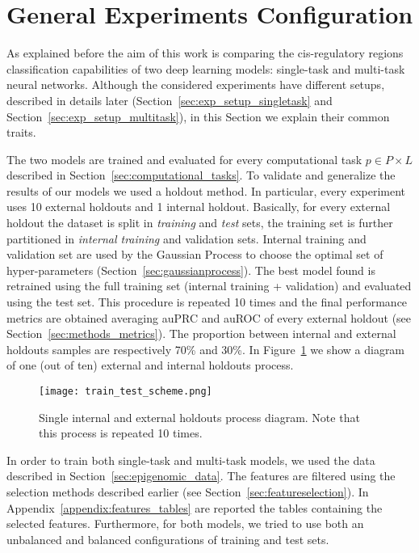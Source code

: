\section{General Experiments Configuration}
\label{sec:exp_setup_general}
As explained before the aim of this work is comparing the  cis-regulatory regions classification capabilities of two deep learning models: single-task and multi-task neural networks. Although the considered experiments have different setups, described in details later (Section~\ref{sec:exp_setup_singletask} and Section~\ref{sec:exp_setup_multitask}), in this Section we explain their common traits. 

The two models are trained and evaluated for every computational task $p \in P \times L$ described in Section~\ref{sec:computational_tasks}. 
To validate and generalize the results of our
models we used a holdout method. In particular, every experiment uses 10 external holdouts and 1 internal
holdout. Basically, for every external
holdout the dataset is split in \emph{training} and \emph{test} sets, the
training set is further partitioned in \emph{internal training} and validation
sets. Internal training and validation set are used by the Gaussian Process to
choose the optimal set of hyper-parameters (Section~\ref{sec:gaussianprocess}).
The best model found is retrained using the full training set (internal training + validation) and evaluated using the test set. This procedure is
repeated 10 times and the final performance metrics are obtained averaging auPRC
and auROC of every external holdout (see Section~\ref{sec:methods_metrics}). The proportion between internal and external holdouts samples are respectively 70\% and 30\%. In Figure~\ref{fig:train_test_diagram} we show a diagram of one (out of ten) external and internal holdouts process. 
\begin{figure}[ht]
\centering
\texttt{[image: train\_test\_scheme.png]}
\caption{Single internal and external holdouts process diagram. Note that this
process is repeated 10 times.} 
\label{fig:train_test_diagram}
\end{figure}
In order to train both single-task and multi-task models, we used the data described in Section~\ref{sec:epigenomic_data}. The features are filtered using the selection methods described earlier (see Section~\ref{sec:featureselection}). In Appendix~\ref{appendix:features_tables} are reported the tables containing the selected features. 
Furthermore, for both models, we tried to use both an unbalanced and balanced configurations of training and test sets. 

